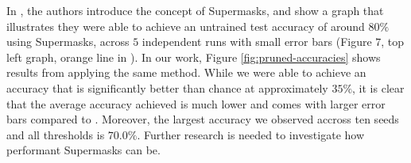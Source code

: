 \documentclass[12pt,final,twoside]{article}
\theoremstyle{plain}
\theoremstyle{definition}
\theoremstyle{remark}
\theoremstyle{named}
\begin{document}
In \cite{supermask}, the authors introduce the concept of Supermasks, and show a graph that illustrates they were able to achieve an untrained test accuracy of around $80\%$ using Supermasks, across $5$ independent runs with small error bars (Figure $7$, top left graph, orange line in \cite{supermask}). In our work, Figure \ref{fig:pruned-accuracies} shows results from applying the same method. While we were able to achieve an accuracy that is significantly better than chance at approximately $35 \%$, it is clear that the average accuracy achieved is much lower and comes with larger error bars compared to \cite{supermask}. Moreover, the largest accuracy we observed accross ten seeds and all thresholds is $70.0\%$. Further research is needed to investigate how performant Supermasks can be.




    \printbibliography
\end{document}
